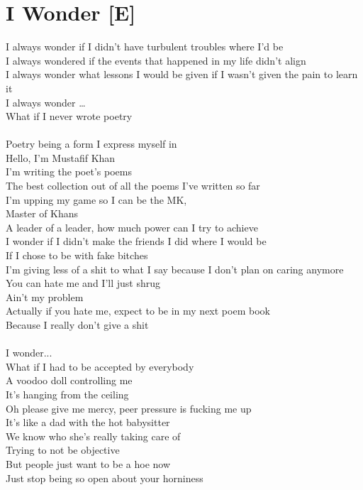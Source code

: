\documentclass[12pt, b5paper, oneside]{book}
\begin{document}
\section{I Wonder [E]}
I always wonder if I didn't have turbulent troubles where I'd be
\\I always wondered if the events that happened in my life didn't align
\\I always wonder what lessons I would be given if I wasn't given the pain to learn it
\\I always wonder \dots 
\\What if I never wrote poetry
%
\\\\Poetry being a form I express myself in
\\Hello, I'm Mustafif Khan
\\I'm writing the poet's poems
\\The best collection out of all the poems I've written so far
\\I'm upping my game so I can be the MK,
\\Master of Khans
\\A leader of a leader, how much  power can I try to achieve
\\I wonder if I didn't make the friends I did where I would be
\\If I chose to be with fake bitches
\\I'm giving less of a shit to what I say because I don't plan on caring anymore
\\You can hate me and I'll just shrug
\\Ain't my problem
\\Actually if you hate me, expect to be in my next poem book
\\Because I really don't give a shit
%
\\\\I wonder...
\\What if I had to be accepted by everybody
\\A voodoo doll controlling me
\\It's hanging from the ceiling
\\Oh please give me mercy, peer pressure is fucking me up
\\It's like a dad with the hot babysitter
\\We know who she's really taking care of
\\Trying to not be objective
\\But people just want to be a hoe now
\\Just stop being so open about your horniness
\end{document}

